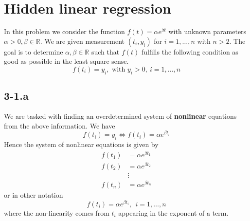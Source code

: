 \documentclass{article}
\begin{document}
\section*{Hidden linear regression}
In this problem we consider the function $f\left(t\right) = \alpha e^{\beta t}$ with unknown parameters $\alpha > 0, \beta \in \mathbb{R}$. We are given measurement $\left(t_{i}, y_{i}\right)$ for $i = 1, \dots, n$ with $n > 2$. The goal is to determine $\alpha, \beta \in \mathbb{R}$ such that $f\left(t\right)$ fulfills the following condition as good as possible in the least square sense.
\begin{equation*}
    f\left(t_{i}\right) = y_{i}, \text{ with } y_{i} > 0, \: i = 1, \dots, n
\end{equation*}
\subsection*{3-1.a}
We are tasked with finding an overdetermined system of \textbf{nonlinear} equations from the above information. We have 
\begin{equation*}
    f\left(t_{i}\right) = y_{i} \Longleftrightarrow f\left(t_{i}\right) = \alpha e^{\beta t_{i}}
\end{equation*}
Hence the system of nonlinear equations is given by
\begin{align*}
   f\left(t_{1}\right) &= \alpha e^{\beta t_{1}} \\
   f\left(t_{2}\right) &= \alpha e^{\beta t_{2}} \\
   &\vdots \\
   f\left(t_{n}\right) &= \alpha e^{\beta t_{n}} 
\end{align*}
or in other notation
\begin{equation*}
    f\left(t_{i}\right) = \alpha e^{\beta t_{i}}, \: \: i = 1, \dots, n
\end{equation*}
where the non-linearity comes from $t_{i}$ appearing in the exponent of a term.
\end{document}
